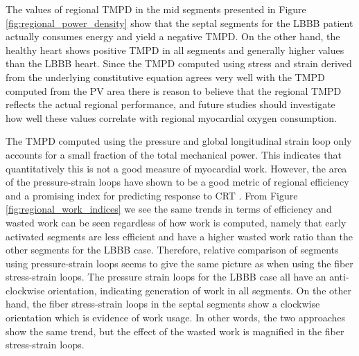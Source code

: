The values of regional TMPD in the mid segments presented
in Figure \ref{fig:regional_power_density} show that the septal
segments for the LBBB patient actually consumes energy and yield a
negative TMPD. On the other hand, the healthy heart shows positive TMPD
in all segments and generally higher values than the LBBB heart.
Since the TMPD computed using stress and strain derived from the
underlying constitutive equation agrees very well with the TMPD
computed from the PV area there is reason to believe that the regional
TMPD reflects the actual regional performance, and future studies should
investigate how well these values correlate with regional myocardial
oxygen consumption. 

The TMPD computed using the pressure and global longitudinal strain loop
only accounts for a small fraction of the total mechanical power.
This indicates that quantitatively this is not a good measure of
myocardial work. However, the area of the pressure-strain loops have shown to be a good metric
of regional efficiency and a promising index for predicting response
to CRT \cite{vecera2016wasted}. From Figure
\ref{fig:regional_work_indices} we see the same trends in terms of efficiency and wasted
work can be seen regardless of how work is computed, namely that early
activated segments are less efficient and have a higher wasted work
ratio than the other segments for the LBBB case. Therefore, relative
comparison of segments using pressure-strain loops seems to give the
same picture as when using the fiber stress-strain loops. 
The pressure strain loops for the LBBB case all have an
anti-clockwise orientation, indicating generation of work in all
segments. On the other hand, the fiber stress-strain loops in the
septal segments show a clockwise orientation which is evidence of
work usage. In other words, the two approaches show the same
trend, but the effect of the wasted work is magnified in the fiber
stress-strain loops.  



